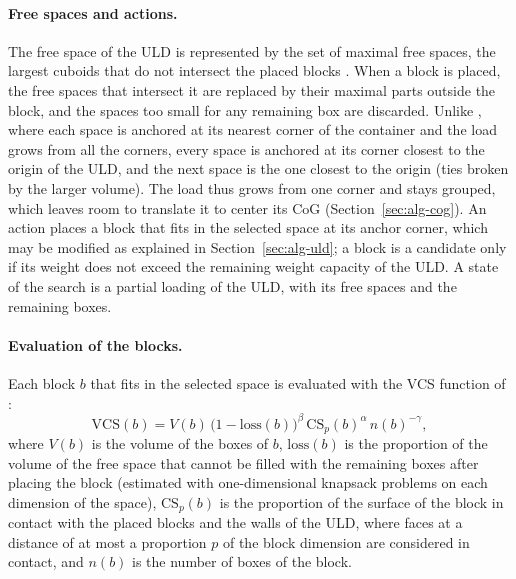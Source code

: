 \paragraph{Free spaces and actions.}
The free space of the ULD is represented by the set of maximal free spaces, the largest
cuboids that do not intersect the placed blocks \citep{Parreno2008}. When a block is placed, the
free spaces that intersect it are replaced by their maximal parts outside the block, and the
spaces too small for any remaining box are discarded. Unlike \citet{Araya2014}, where each
space is anchored at its nearest corner of the container and the load grows from all the corners,
every space is anchored at its corner closest to the origin of the ULD, and the next space is
the one closest to the origin (ties broken by the larger volume). The load thus grows from one
corner and stays grouped, which leaves room to translate it to center its CoG
(Section~\ref{sec:alg-cog}).
An action places a block that fits in the selected space at its anchor corner, which may be
modified as explained in Section~\ref{sec:alg-uld}; a block is a candidate only if its weight
does not exceed the remaining weight capacity of the ULD. A state of the
search is a partial loading of the ULD, with its free spaces and the remaining boxes.

\paragraph{Evaluation of the blocks.}
Each block $b$ that fits in the selected space is evaluated with the VCS function of
\citet{Araya2017}:
\begin{equation}
\label{eq:vcs}
\mathrm{VCS}(b) = V(b)\,\bigl(1 - \mathrm{loss}(b)\bigr)^{\beta}\,\mathrm{CS}_p(b)^{\alpha}\,
	n(b)^{-\gamma},
\end{equation}
where $V(b)$ is the volume of the boxes of $b$, $\mathrm{loss}(b)$ is the proportion of
the volume of the free space that cannot be filled with the remaining boxes after placing the
block (estimated with one-dimensional knapsack problems on each dimension of the space),
$\mathrm{CS}_p(b)$ is the proportion of the surface of the block in contact with the placed
blocks and the walls of the ULD, where faces at a distance of at most a proportion $p$ of the
block dimension are considered in contact, and $n(b)$ is the number of boxes of the block.

